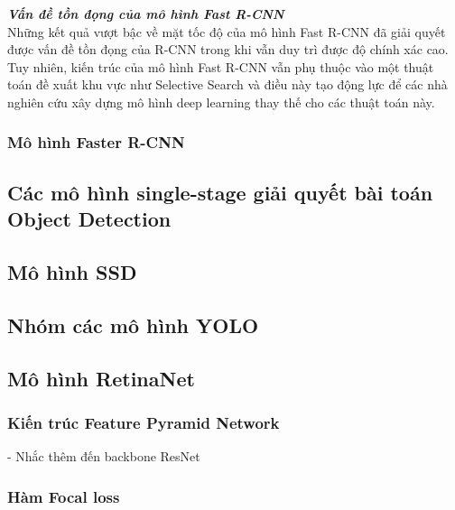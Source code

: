 {        \noindent
        \textbf{\textit{Vấn đề tồn đọng của mô hình Fast R-CNN}} \\
        Những kết quả vượt bậc về mặt tốc độ của mô hình Fast R-CNN đã giải quyết được vấn đề tồn đọng của R-CNN trong khi vẫn duy trì được độ chính xác cao.
        Tuy nhiên, kiến trúc của mô hình Fast R-CNN vẫn phụ thuộc vào một thuật toán đề xuất khu vực như Selective Search và điều này tạo động lực để các nhà nghiên cứu xây dựng mô hình deep learning thay thế cho các thuật toán này.

    \subsubsection{Mô hình Faster R-CNN}
    
    \subsection{Các mô hình single-stage giải quyết bài toán Object Detection}
    \subsection{Mô hình SSD}

    \subsection{Nhóm các mô hình YOLO}

    \subsection{Mô hình RetinaNet}
    \subsubsection{Kiến trúc Feature Pyramid Network}
    - Nhắc thêm đến backbone ResNet
    \subsubsection{Hàm Focal loss}
}